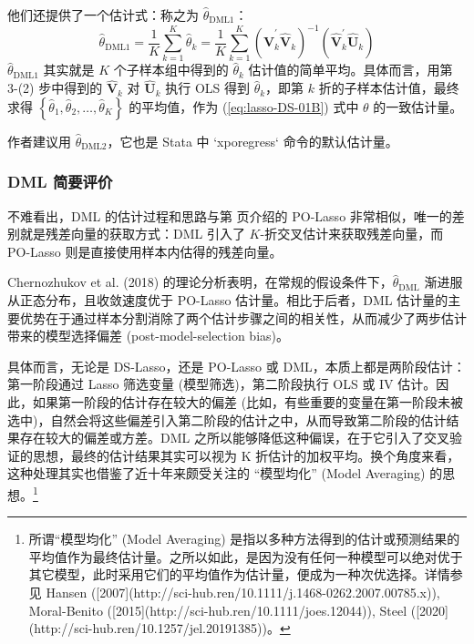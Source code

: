 {他们还提供了一个估计式：称之为 $\widehat{\theta}_{\mathrm{DML1}}$：
\begin{equation}\label{eq:lasso-DML-02}
	 \widehat{\theta}_{\mathrm{DML1}}
	 = 
	 \frac{1}{K}
	 	 \sum_{k=1}^{K}\widehat{\theta}_k
	 = 
	 \frac{1}{K}
	 \sum_{k=1}^{K}\left(\widehat{\boldsymbol{V}}_{k}^{\prime} \widehat{\boldsymbol{V}}_{k}\right)^{-1}\left(\widehat{\boldsymbol{V}}_{k}^{\prime} \widehat{\boldsymbol{U}}_{k}\right)
\end{equation}
$\widehat{\theta}_{\mathrm{DML1}}$ 其实就是 $K$ 个子样本组中得到的 $\widehat{\theta}_k$ 估计值的简单平均。具体而言，用第 3-(2) 步中得到的 $\widehat{\boldsymbol{V}}_{k}$ 对 $\widehat{\boldsymbol{U}}_{k}$ 执行 OLS 得到 $\widehat{\theta}_k$，即第 $k$ 折的子样本估计值，最终求得 $\left\{\widehat{\theta}_1, \widehat{\theta}_2, \ldots, \widehat{\theta}_K \right\}$ 的平均值，作为 (\ref{eq:lasso-DS-01B}) 式中 $\theta$ 的一致估计量。

作者建议用 $\widehat{\theta}_{\mathrm{DML2}}$，它也是 Stata 中 `xporegress` 命令的默认估计量。 

\subsubsection{DML 简要评价}
不难看出，DML 的估计过程和思路与第 \pageref{page:lasso-polasso} 页介绍的 PO-Lasso 非常相似，唯一的差别就是残差向量的获取方式：DML 引入了 $K$-折交叉估计来获取残差向量，而 PO-Lasso 则是直接使用样本内估得的残差向量。

Chernozhukov et al. (2018) 的理论分析表明，在常规的假设条件下，$\widehat{\theta}_{\mathrm{DML}}$ 渐进服从正态分布，且收敛速度优于 PO-Lasso 估计量。相比于后者，DML 估计量的主要优势在于通过样本分割消除了两个估计步骤之间的相关性，从而减少了两步估计带来的模型选择偏差 (post-model-selection bias)。

具体而言，无论是 DS-Lasso，还是 PO-Lasso 或 DML，本质上都是两阶段估计：第一阶段通过  Lasso 筛选变量 (模型筛选)，第二阶段执行 OLS 或 IV 估计。因此，如果第一阶段的估计存在较大的偏差 (比如，有些重要的变量在第一阶段未被选中)，自然会将这些偏差引入第二阶段的估计之中，从而导致第二阶段的估计结果存在较大的偏差或方差。DML 之所以能够降低这种偏误，在于它引入了交叉验证的思想，最终的估计结果其实可以视为 K 折估计的加权平均。换个角度来看，这种处理其实也借鉴了近十年来颇受关注的 “模型均化” (Model Averaging) 的思想。\footnote{%
  所谓“模型均化” (Model Averaging) 是指以多种方法得到的估计或预测结果的平均值作为最终估计量。之所以如此，是因为没有任何一种模型可以绝对优于其它模型，此时采用它们的平均值作为估计量，便成为一种次优选择。详情参见 Hansen ([2007](http://sci-hub.ren/10.1111/j.1468-0262.2007.00785.x)), Moral-Benito ([2015](http://sci-hub.ren/10.1111/joes.12044)), Steel ([2020](http://sci-hub.ren/10.1257/jel.20191385))。}

}
